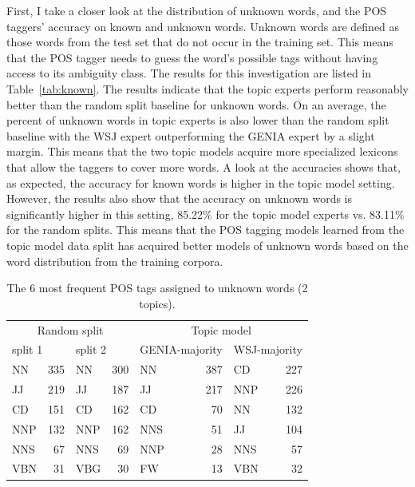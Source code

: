 First, I take a closer look at the distribution of unknown words, and the POS taggers' accuracy on known and unknown words. Unknown words are defined as those words from the test set that do not occur in the training set. This means that the POS tagger needs to guess the word's possible tags without having access to its ambiguity class. The results for this investigation are listed in Table~\ref{tab:known}. The results indicate that the topic experts perform reasonably better than the random split baseline for unknown words. On an average, the percent of unknown words in topic experts is also lower than the random split baseline with the WSJ expert outperforming the GENIA expert by a slight margin.
This means that the two topic models acquire more specialized lexicons that allow the taggers to cover more words. A look at the accuracies shows that, as expected, the accuracy for known words is higher in the topic model setting. However, the results also show that the accuracy on unknown words is significantly higher in this setting, 85.22\%  for the topic model experts vs. 83.11\% for the random splits. This means that the POS tagging models learned from the topic model data split has acquired better models of unknown words based on the word distribution from the training corpora.

\begin{table}[t]
\begin{small}
	\begin{center}
		\begin{tabular}{lrlr|lrlr}
			\multicolumn{4}{c}{Random split} &  \multicolumn{4}{|c}{Topic model}\\
			\multicolumn{2}{l}{split 1} & \multicolumn{2}{l}{split 2} & \multicolumn{2}{|l}{GENIA-majority} & \multicolumn{2}{l}{WSJ-majority} \\
			\hline
			NN	& 335	&	NN	& 300		   & NN	  & 387 	& CD	&  227							\\
			JJ	& 219   &	JJ	& 187		   & JJ	  & 217 	& NNP	&  226							\\
			CD	& 151   &	CD	& 162		   & CD	  & 70		& NN	&  132 							\\
			NNP	& 132   &	NNP	& 162		   & NNS  & 51		& JJ	&  104 							\\
			NNS	& 67    &	NNS	& 69		   & NNP  & 28		& NNS	&  57 							\\
			VBN	& 31    &	VBG	& 30		   & FW	  & 13		& VBN	&  32 							\\
			\hline
		\end{tabular}
	\end{center}
	\end{small}
	\caption{The 6 most frequent POS tags assigned to unknown words (2 topics).\label{tab:res:unkpos}}
\end{table}

